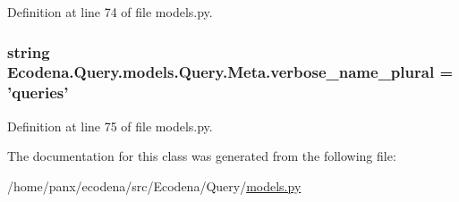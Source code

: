 Definition at line 74 of file models.py.

\hypertarget{class_ecodena_1_1_query_1_1models_1_1_query_1_1_meta_ac57db1e879cded42a3f4d35c04c56be8}{
\subsubsection[{verbose\_\-name\_\-plural}]{\setlength{\rightskip}{0pt plus 5cm}string {\bf Ecodena.Query.models.Query.Meta.verbose\_\-name\_\-plural} = 'queries'}}
\label{d2/d09/class_ecodena_1_1_query_1_1models_1_1_query_1_1_meta_ac57db1e879cded42a3f4d35c04c56be8}


Definition at line 75 of file models.py.



The documentation for this class was generated from the following file:\begin{DoxyCompactItemize}
\item 
/home/panx/ecodena/src/Ecodena/Query/\hyperlink{_query_2models_8py}{models.py}\end{DoxyCompactItemize}
